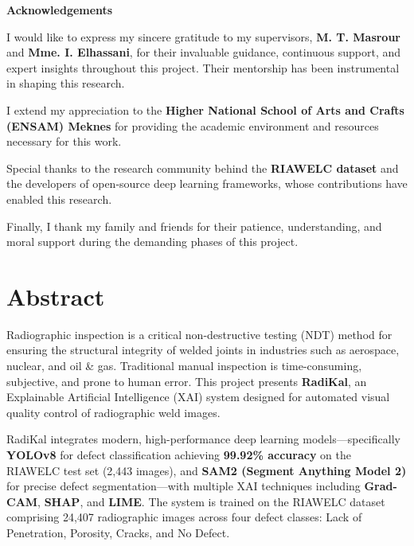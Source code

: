 \documentclass[12pt,a4paper]{report}
\begin{document}
\newpage
\thispagestyle{empty}
\vspace*{3cm}
\begin{center} \textbf{\Huge Acknowledgements} \end{center}
\vspace{1.5cm}
\begin{center} \large
\begin{minipage}{0.85\textwidth}
I would like to express my sincere gratitude to my supervisors, \textbf{M. T. Masrour} and \textbf{Mme. I. Elhassani}, for their invaluable guidance, continuous support, and expert insights throughout this project. Their mentorship has been instrumental in shaping this research.

\vspace{0.8cm}

I extend my appreciation to the \textbf{Higher National School of Arts and Crafts (ENSAM) Meknes} for providing the academic environment and resources necessary for this work.

\vspace{0.8cm}

Special thanks to the research community behind the \textbf{RIAWELC dataset} and the developers of open-source deep learning frameworks, whose contributions have enabled this research.

\vspace{0.8cm}

Finally, I thank my family and friends for their patience, understanding, and moral support during the demanding phases of this project.
\end{minipage}
\end{center}

\chapter*{Abstract}

Radiographic inspection is a critical non-destructive testing (NDT) method for ensuring the structural integrity of welded joints in industries such as aerospace, nuclear, and oil \& gas. Traditional manual inspection is time-consuming, subjective, and prone to human error. This project presents \textbf{RadiKal}, an Explainable Artificial Intelligence (XAI) system designed for automated visual quality control of radiographic weld images.

RadiKal integrates modern, high-performance deep learning models---specifically \textbf{YOLOv8} for defect classification achieving \textbf{99.92\% accuracy} on the RIAWELC test set (2,443 images), and \textbf{SAM2 (Segment Anything Model 2)} for precise defect segmentation---with multiple XAI techniques including \textbf{Grad-CAM}, \textbf{SHAP}, and \textbf{LIME}. The system is trained on the RIAWELC dataset comprising 24,407 radiographic images across four defect classes: Lack of Penetration, Porosity, Cracks, and No Defect.
\end{document}
